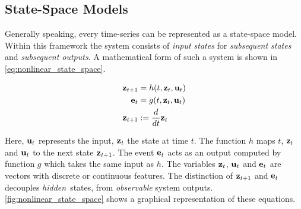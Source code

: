\documentclass[./../../paper.tex]{subfiles}
\begin{document}


\subsection{State-Space Models}
Generally speaking, every time-series can be represented as a state-space model\autocite{kalman_NewApproachLinear_1960}. Within this framework the system consists of \emph{input states} for \emph{subsequent states} and \emph{subsequent outputs}. A mathematical form of such a system is shown in \autoref{eq:nonlinear_state_space}.

\begin{align}
    \label{eq:nonlinear_state_space}
    \mathbf{z}_{t+1} & =h(t, \mathbf{z}_t, \mathbf{u}_t)           \\
    \mathbf{e}_t   & =g(t, \mathbf{z}_t, \mathbf{u}_t) \nonumber \\
    \mathbf{z}_{t+1} &:=\frac{d}{d t} \mathbf{z}_t \nonumber
\end{align}

\noindent Here, $\mathbf{u}_t$ represents the input, $\mathbf{z}_t$ the state at time $t$. The function $h$ maps $t$, $\mathbf{z}_t$ and $\mathbf{u}_t$ to the next state $\mathbf{z}_{t+1}$. The event $\mathbf{e}_t$ acts as an output computed by function $g$ which takes the same input as $h$. The variables $\mathbf{z}_t$, $\mathbf{u}_t$ and $\mathbf{e}_t$ are vectors with discrete or continuous features. The distinction of $\mathbf{z}_{t+1}$ and $\mathbf{e}_t$ decouples \emph{hidden}\footnotemark~states, from \emph{observable} system outputs.
\autoref{fig:nonlinear_state_space} shows a graphical representation of these equations.
\end{document}
